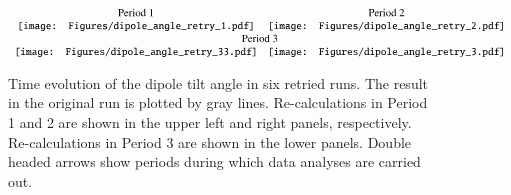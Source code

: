 \begin{figure}[ht]
\begin{center}
\[
\begin{array}{cc}
\mbox{Period 1} & \mbox{Period 2} \\
\texttt{[image: Figures/dipole\_angle\_retry\_1.pdf]} &
\texttt{[image: Figures/dipole\_angle\_retry\_2.pdf]} \\
\multicolumn{2}{c}{\mbox{Period 3}} \\
\texttt{[image: Figures/dipole\_angle\_retry\_33.pdf]} &
\texttt{[image: Figures/dipole\_angle\_retry\_3.pdf]}
\end{array}
\]
\end{center}
\caption{
Time evolution of the dipole tilt angle in six retried runs. 
The result in the original run is plotted by gray lines. 
Re-calculations in Period 1 and 2 are shown in the upper left and right panels, respectively. 
Re-calculations in Period 3 are shown in the lower panels.
Double headed arrows show periods during which data analyses are carried out.
}
\label{fig:dipole_tilt_retries}
\end{figure}